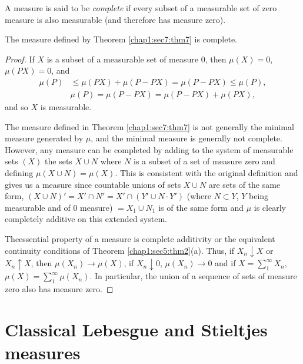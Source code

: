 \begin{defi*}
A measure is said to be {\em complete} if every subset of a measurable
set of zero measure is also measurable (and therefore has measure
zero). 
\end{defi*}

\begin{theorem}\label{chap1:sec7:thm8}%
The measure defined by Theorem \ref{chap1:sec7:thm7} is complete.
\end{theorem}

\begin{proof}
If $X$ is a subset of a measurable set of measure $0$, then $\mu (X)= 0$,
$\mu (PX) = 0$, and  
\begin{align*}
 \mu(P) &\le \mu (PX) + \mu (P - PX) = \mu (P - PX) \le \mu (P),\\
&\mu (P) = \mu (P - PX) = \mu (P - PX) + \mu (PX),
\end{align*}
and so $X$ is measurable.

The measure defined in Theorem \ref{chap1:sec7:thm7} is not generally the minimal measure
generated by $\mu$, and the minimal measure is generally not
complete. However, any measure can be completed by adding to the
system of measurable sets $(X)$  the sets $X \cup N$ where $N$ is a subset
of a set of measure zero and defining $\mu (X \cup N) = \mu (X)$. This
is consistent with the original definition and gives us a measure
since countable unions of sets $X \cup N$ are sets of the same form,
$(X \cup N)'=X'\cap N'= X'\cap(Y' \cup N\cdot Y')$ (where $N \subset Y$,
$Y$ being measurable and of $0$ measure) $= X_1 \cup N_1$ is of the same
form and $\mu$ is clearly completely additive on this extended
system.

The\pageoriginale essential property of a measure is complete additivity or the
equivalent continuity  conditions of Theorem
\ref{chap1:sec5:thm2}(a). Thus, if $X_n \downarrow X$ or 
$X_n \uparrow X$, then $\mu (X_n) \rightarrow \mu (X)$, if $X_n
\downarrow 0$, $\mu (X_n) \rightarrow 0$ and if
$X=\sum\limits^{\infty}_{1} X_n$, $\mu (X)= \sum\limits^{\infty}_{1}
\mu (X_n)$.  In particular, the union of a sequence of sets of measure
zero also has measure zero. 
\end{proof}

\section{Classical Lebesgue and Stieltjes measures}\label{chap1:sec8}

